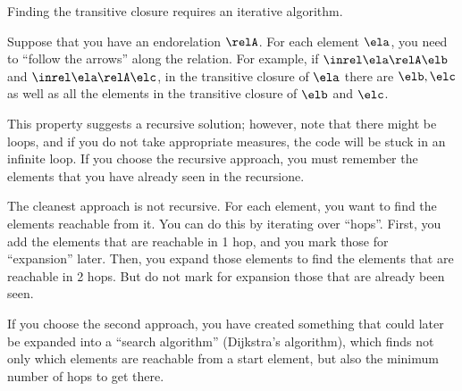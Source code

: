 
\begin{hint}
    Finding the transitive closure requires an iterative algorithm.

    Suppose that you have an endorelation $\relA$.
    For each element $\ela$, you need to ``follow the arrows'' along the relation.
    For example, if  $\inrel \ela \relA \elb$ and  $\inrel \ela \relA \elc$, in the transitive closure of $\ela$ there are $\elb, \elc$ as well as all the elements in the transitive closure of $\elb$ and $\elc$.

    This property suggests a recursive solution; however, note that there might be loops, and if you do not take appropriate measures, the code will be stuck in an infinite loop.
    If you choose the recursive approach, you must remember the elements that you have already seen in the recursione.

    The cleanest approach is not recursive.
    For each element, you want to find the elements reachable from it.
    You can do this by iterating over ``hops''.
    First, you add the elements that are reachable in 1 hop, and you mark those for ``expansion'' later.
    Then, you expand those elements to find the elements that are reachable in 2 hops.
    But do not mark for expansion those that are already been seen.

    If you choose the second approach, you have created something that could later be expanded into a ``search algorithm'' (Dijkstra's algorithm), which finds not only which elements are reachable from a start element, but also the minimum number of hops to get there.
\end{hint}
